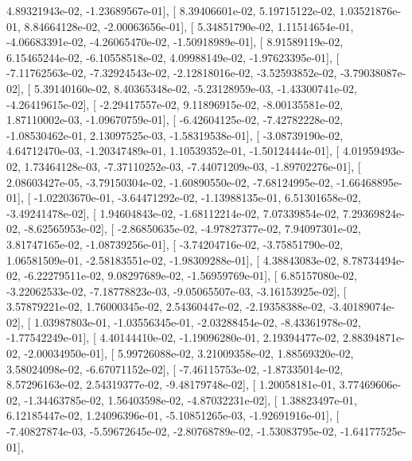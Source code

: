 \documentclass{article}
\begin{document}
          4.89321943e-02,  -1.23689567e-01],
       [  8.39406601e-02,   5.19715122e-02,   1.03521876e-01,
          8.84664128e-02,  -2.00063656e-01],
       [  5.34851790e-02,   1.11514654e-01,  -4.06683391e-02,
         -4.26065470e-02,  -1.50918989e-01],
       [  8.91589119e-02,   6.15465244e-02,  -6.10558518e-02,
          4.09988149e-02,  -1.97623395e-01],
       [ -7.11762563e-02,  -7.32924543e-02,  -2.12818016e-02,
         -3.52593852e-02,  -3.79038087e-02],
       [  5.39140160e-02,   8.40365348e-02,  -5.23128959e-03,
         -1.43300741e-02,  -4.26419615e-02],
       [ -2.29417557e-02,   9.11896915e-02,  -8.00135581e-02,
          1.87110002e-03,  -1.09670759e-01],
       [ -6.42604125e-02,  -7.42782228e-02,  -1.08530462e-01,
          2.13097525e-03,  -1.58319538e-01],
       [ -3.08739190e-02,   4.64712470e-03,  -1.20347489e-01,
          1.10539352e-01,  -1.50124444e-01],
       [  4.01959493e-02,   1.73464128e-03,  -7.37110252e-03,
         -7.44071209e-03,  -1.89702276e-01],
       [  2.08603427e-05,  -3.79150304e-02,  -1.60890550e-02,
         -7.68124995e-02,  -1.66468895e-01],
       [ -1.02203670e-01,  -3.64471292e-02,  -1.13988135e-01,
          6.51301658e-02,  -3.49241478e-02],
       [  1.94604843e-02,  -1.68112214e-02,   7.07339854e-02,
          7.29369824e-02,  -8.62565953e-02],
       [ -2.86850635e-02,  -4.97827377e-02,   7.94097301e-02,
          3.81747165e-02,  -1.08739256e-01],
       [ -3.74204716e-02,  -3.75851790e-02,   1.06581509e-01,
         -2.58183551e-02,  -1.98309288e-01],
       [  4.38843083e-02,   8.78734494e-02,  -6.22279511e-02,
          9.08297689e-02,  -1.56959769e-01],
       [  6.85157080e-02,  -3.22062533e-02,  -7.18778823e-03,
         -9.05065507e-03,  -3.16153925e-02],
       [  3.57879221e-02,   1.76000345e-02,   2.54360447e-02,
         -2.19358388e-02,  -3.40189074e-02],
       [  1.03987803e-01,  -1.03556345e-01,  -2.03288454e-02,
         -8.43361978e-02,  -1.77542249e-01],
       [  4.40144410e-02,  -1.19096280e-01,   2.19394477e-02,
          2.88394871e-02,  -2.00034950e-01],
       [  5.99726088e-02,   3.21009358e-02,   1.88569320e-02,
          3.58024098e-02,  -6.67071152e-02],
       [ -7.46115753e-02,  -1.87335014e-02,   8.57296163e-02,
          2.54319377e-02,  -9.48179748e-02],
       [  1.20058181e-01,   3.77469606e-02,  -1.34463785e-02,
          1.56403598e-02,  -4.87032231e-02],
       [  1.38823497e-01,   6.12185447e-02,   1.24096396e-01,
         -5.10851265e-03,  -1.92691916e-01],
       [ -7.40827874e-03,  -5.59672645e-02,  -2.80768789e-02,
         -1.53083795e-02,  -1.64177525e-01],
\end{document}
